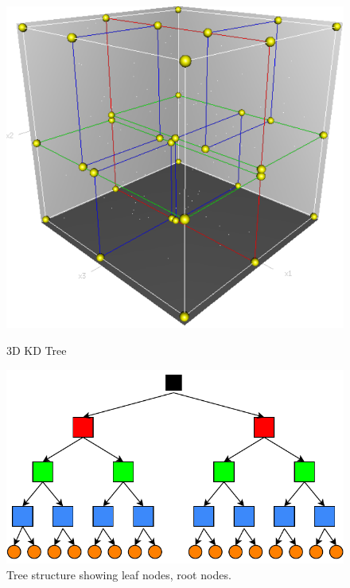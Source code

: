 \begin{figure}[htbp]
    \centering
    \begin{minipage}[b]{0.45\textwidth}
    \centering
    \includegraphics[width=1\linewidth]{97_graphics/related_work/kdtree_cube.pdf}
    \caption{3D KD Tree \parencite{3d_kd_tree}}
    \label{fig:related_work-kdtree}
    \end{minipage}
    \hfill
    \begin{minipage}[b]{0.45\textwidth}
    \centering
    \includegraphics[width=1\linewidth]{97_graphics/related_work/kdtree_tree.pdf}
    \caption{Tree structure showing leaf nodes, root nodes.}
    \label{fig:related_work-search_tree}
    \end{minipage}
\end{figure}

